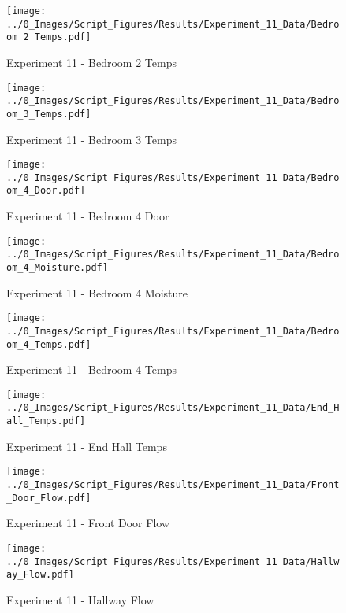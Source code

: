 	\begin{figure}[H]
		\centering
		\texttt{[image: ../0\_Images/Script\_Figures/Results/Experiment\_11\_Data/Bedroom\_2\_Temps.pdf]}
		\caption[]{Experiment 11 - Bedroom 2 Temps}
	\end{figure}
 
	\clearpage

	\begin{figure}[H]
		\centering
		\texttt{[image: ../0\_Images/Script\_Figures/Results/Experiment\_11\_Data/Bedroom\_3\_Temps.pdf]}
		\caption[]{Experiment 11 - Bedroom 3 Temps}
	\end{figure}
 

	\begin{figure}[H]
		\centering
		\texttt{[image: ../0\_Images/Script\_Figures/Results/Experiment\_11\_Data/Bedroom\_4\_Door.pdf]}
		\caption[]{Experiment 11 - Bedroom 4 Door}
	\end{figure}
 
	\clearpage

	\begin{figure}[H]
		\centering
		\texttt{[image: ../0\_Images/Script\_Figures/Results/Experiment\_11\_Data/Bedroom\_4\_Moisture.pdf]}
		\caption[]{Experiment 11 - Bedroom 4 Moisture}
	\end{figure}
 

	\begin{figure}[H]
		\centering
		\texttt{[image: ../0\_Images/Script\_Figures/Results/Experiment\_11\_Data/Bedroom\_4\_Temps.pdf]}
		\caption[]{Experiment 11 - Bedroom 4 Temps}
	\end{figure}
 
	\clearpage

	\begin{figure}[H]
		\centering
		\texttt{[image: ../0\_Images/Script\_Figures/Results/Experiment\_11\_Data/End\_Hall\_Temps.pdf]}
		\caption[]{Experiment 11 - End Hall Temps}
	\end{figure}
 

	\begin{figure}[H]
		\centering
		\texttt{[image: ../0\_Images/Script\_Figures/Results/Experiment\_11\_Data/Front\_Door\_Flow.pdf]}
		\caption[]{Experiment 11 - Front Door Flow}
	\end{figure}
 
	\clearpage

	\begin{figure}[H]
		\centering
		\texttt{[image: ../0\_Images/Script\_Figures/Results/Experiment\_11\_Data/Hallway\_Flow.pdf]}
		\caption[]{Experiment 11 - Hallway Flow}
	\end{figure}
 


